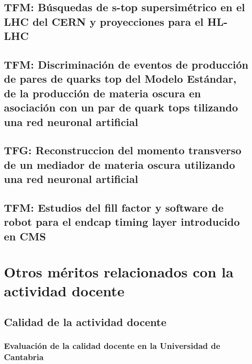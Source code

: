 \documentclass[a4paper, 11pt, twoside, openright]{report}
\begin{document}
\subsection{TFM: Búsquedas de s-top supersimétrico en el LHC del CERN y proyecciones para el HL-LHC}


\subsection{TFM: Discriminación de eventos de producción de pares de quarks top del Modelo Estándar, de la producción de materia oscura en asociación con un par de quark tops tilizando una red neuronal artificial}


\subsection{TFG: Reconstruccion del momento transverso de un mediador de materia oscura utilizando una red neuronal artificial}


\subsection{TFM: Estudios del fill factor y software de robot para el endcap timing layer introducido en CMS}




\section{Otros méritos relacionados con la actividad docente}

\subsection{Calidad de la actividad docente}

\subsubsection{Evaluación de la calidad docente en la Universidad de Cantabria}

\end{document}
